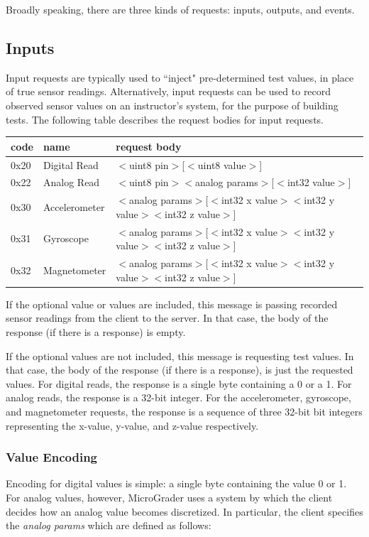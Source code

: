 \documentclass[12pt]{article}
\begin{document}
\begin{appendices}
Broadly speaking, there are three kinds of requests: inputs, outputs, and events.

\subsection{Inputs}
Input requests are typically used to ``inject" pre-determined test values, in place of true sensor readings.  Alternatively, input requests can be used to record observed sensor values on an instructor's system, for the purpose of building tests.  The following table describes the request bodies for input requests.

\begin{center}
\begin{tabular}{l l l}
code & name & request body \\ \hline
0x20 & Digital Read & $<$uint8 pin$>$[$<$uint8 value$>$] \\
0x22 & Analog Read & $<$uint8 pin$>$$<$analog params$>$[$<$int32 value$>$] \\
0x30 & Accelerometer & $<$analog params$>$[$<$int32 x value$>$$<$int32 y value$>$$<$int32 z value$>$] \\
0x31 & Gyroscope & $<$analog params$>$[$<$int32 x value$>$$<$int32 y value$>$$<$int32 z value$>$] \\
0x32 & Magnetometer & $<$analog params$>$[$<$int32 x value$>$$<$int32 y value$>$$<$int32 z value$>$] \\ \hline
\end{tabular}
\end{center}

\vspace{5mm}

If the optional value or values are included, this message is passing recorded sensor readings from the client to the server.  In that case, the body of the response (if there is a response) is empty.  

If the optional values are not included, this message is requesting test values.  In that case, the body of the response (if there is a response), is just the requested values.  For digital reads, the response is a single byte containing a 0 or a 1.  For analog reads, the response is a 32-bit integer.  For the accelerometer, gyroscope, and magnetometer requests, the response is a sequence of three 32-bit bit integers representing the x-value, y-value, and z-value respectively.

\subsubsection{Value Encoding}
Encoding for digital values is simple: a single byte containing the value 0 or 1.  For analog values, however, MicroGrader uses a system by which the client decides how an analog value becomes discretized.  In particular, the client specifies the \textit{analog params} which are defined as follows:


\end{appendices}
\end{document}
